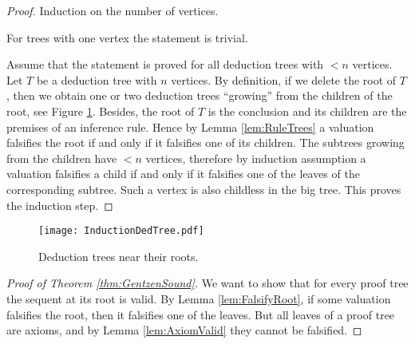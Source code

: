 \begin{proof}
Induction on the number of vertices.

For trees with one vertex the statement is trivial.

Assume that the statement is proved for all deduction trees with $< n$ vertices.
Let $T$ be a deduction tree with $n$ vertices.
By definition, if we delete the root of $T$, then we obtain one or two deduction trees ``growing'' from the children of the root,
see Figure \ref{fig:InductionDedTree}.
Besides, the root of $T$ is the conclusion and its children are the premises of an inference rule.
Hence by Lemma \ref{lem:RuleTrees} a valuation falsifies the root if and only if it falsifies one of its children.
The subtrees growing from the children have $< n$ vertices,
therefore by induction assumption a valuation falsifies a child if and only if it falsifies one of the leaves of the corresponding subtree.
Such a vertex is also childless in the big tree.
This proves the induction step.
\end{proof}

\begin{figure}[ht]
\begin{center}
\texttt{[image: InductionDedTree.pdf]}
\end{center}
\caption{Deduction trees near their roots.}
\label{fig:InductionDedTree}
\end{figure}

\begin{proof}[Proof of Theorem \ref{thm:GentzenSound}]
We want to show that for every proof tree the sequent at its root is valid.
By Lemma \ref{lem:FalsifyRoot}, if some valuation falsifies the root, then it falsifies one of the leaves.
But all leaves of a proof tree are axioms, and by Lemma \ref{lem:AxiomValid} they cannot be falsified.
\end{proof}

